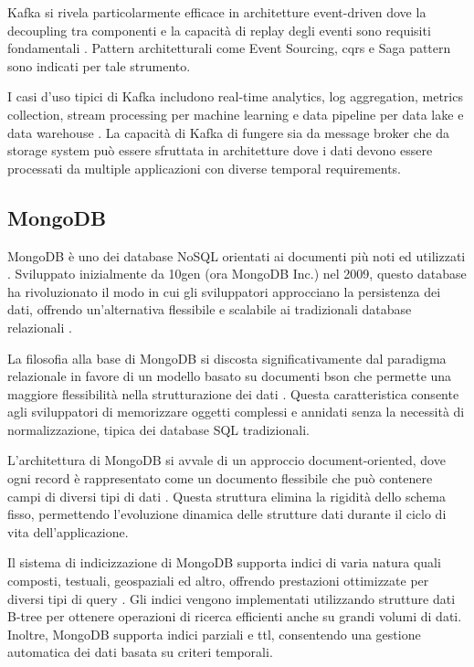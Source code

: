 Kafka si rivela particolarmente efficace in architetture event-driven dove la decoupling tra componenti e la capacità
di replay degli eventi sono requisiti fondamentali \cite{stopford2018designing}.
Pattern architetturali come Event Sourcing, \acrfull{cqrs} e Saga pattern sono indicati per tale strumento.

I casi d'uso tipici di Kafka includono real-time analytics, log aggregation, metrics collection, stream processing
per machine learning e data pipeline per data lake e data warehouse \cite{kreps2014kafka}.
La capacità di Kafka di fungere sia da message broker che da storage system può essere sfruttata in architetture
dove i dati devono essere processati da multiple applicazioni con diverse temporal requirements.

\subsection{MongoDB}

MongoDB è uno dei database NoSQL orientati ai documenti più noti ed utilizzati \cite{chodorow2013mongodb}.
Sviluppato inizialmente da 10gen (ora MongoDB Inc.) nel 2009, questo database ha rivoluzionato il modo in cui
gli sviluppatori approcciano la persistenza dei dati, offrendo un'alternativa flessibile e scalabile
ai tradizionali database relazionali \cite{banker2011mongodb}.

La filosofia alla base di MongoDB si discosta significativamente dal paradigma relazionale in favore di un modello
basato su documenti \acrfull{bson} che permette una maggiore flessibilità nella strutturazione
dei dati \cite{plugge2010mongodb}. Questa caratteristica consente agli sviluppatori di memorizzare
oggetti complessi e annidati senza la necessità di normalizzazione, tipica dei database SQL tradizionali.

L'architettura di MongoDB si avvale di un approccio document-oriented, dove ogni record è rappresentato come
un documento flessibile che può contenere campi di diversi tipi di dati \cite{harrison2015mongodb}.
Questa struttura elimina la rigidità dello schema fisso, permettendo l'evoluzione dinamica delle strutture dati
durante il ciclo di vita dell'applicazione.

Il sistema di indicizzazione di MongoDB supporta indici di varia natura quali composti, testuali, geospaziali ed altro,
offrendo prestazioni ottimizzate per diversi tipi di query \cite{membrey2014definitive}.
Gli indici vengono implementati utilizzando strutture dati B-tree per ottenere operazioni di ricerca efficienti
anche su grandi volumi di dati. Inoltre, MongoDB supporta indici parziali e \acrfull{ttl}, consentendo una gestione
automatica dei dati basata su criteri temporali.


